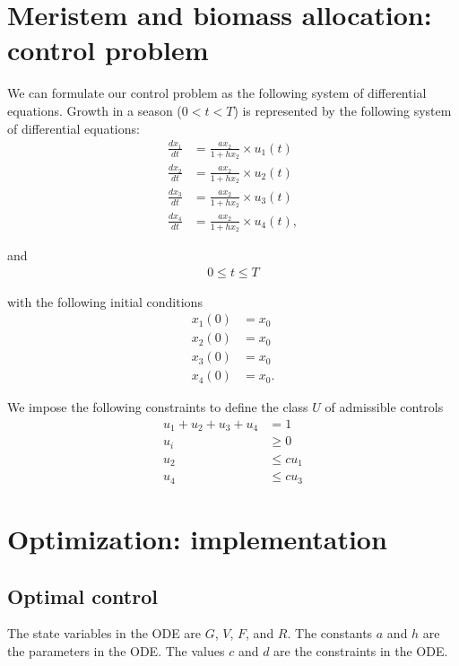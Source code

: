 \documentclass[12pt, oneside]{article}   	%
\begin{document}
\section*{Meristem and biomass allocation: control problem}

\noindent We can formulate our control problem as the following system of differential equations. Growth in a season ($0<t<T$) is represented by the following system of differential equations:
\begin{align}
\frac{dx_1}{dt} & = \frac{a x_2}{1 + h x_2} \times u_1(t) \label{eq:1}  \\
\frac{dx_2}{dt} & = \frac{a x_2}{1 + h x_2} \times u_2(t) \label{eq:2}   \\
\frac{dx_3}{dt} & = \frac{a x_2}{1 + h x_2} \times u_3(t) \label{eq:3}  \\
\frac{dx_4}{dt} & = \frac{a x_2}{1 + h x_2} \times u_4(t) \label{eq:4},
\end{align}

\noindent and 
\begin{align}
0 \leq t \leq T
\end{align}

\noindent with the following initial conditions
\begin{align}
x_1(0) & = x_0 \label{eq:1}  \\
x_2(0) & = x_0 \label{eq:1}  \\
x_3(0) & = x_0 \label{eq:1}  \\
x_4(0) & = x_0 \label{eq:1}.  
\end{align}

\noindent We impose the following constraints to define the class $U$ of admissible controls
\begin{align}
 u_1 + u_2 + u_3 + u_4 & = 1 \label{eq:6} \\ 
 u_i & \geq 0 \label{eq:7}  \\
 u_2 & \leq c u_1 \label{eq:8}  \\
 u_4 & \leq c u_3 \label{eq:9}  
\end{align}     

\section*{Optimization: implementation} \label{mathrefs}
\subsection*{Optimal control}

\noindent The state variables in the ODE are $G$, $V$, $F$, and $R$. The constants $a$ and $h$ are the parameters in the ODE. The values $c$ and $d$ are the constraints in the ODE. \\
\end{document}

